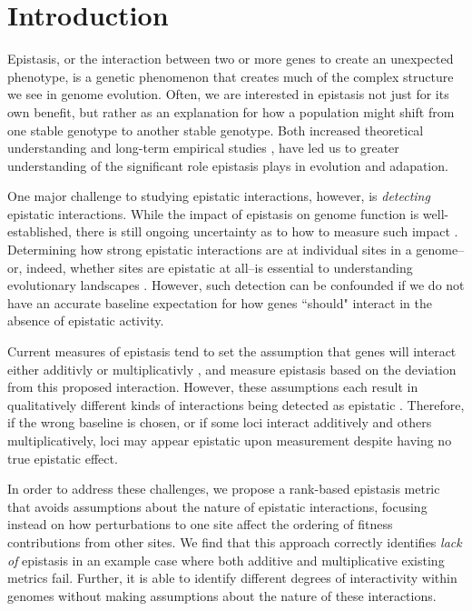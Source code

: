 \section{Introduction}

Epistasis, or the interaction between two or more genes to create an unexpected phenotype, is a genetic phenomenon that creates much of the complex structure we see in genome evolution. Often, we are interested in epistasis not just for its own benefit, but rather as an explanation for how a population might shift from one stable genotype to another stable genotype. Both increased theoretical understanding \citep{weinreich_should_2013, payne_causes_2019} and long-term empirical studies \citep{khan_negative_2011, wiser_long-term_2013, gupta_shared_2016}, have led us to greater understanding of the significant role epistasis plays in evolution and adapation.

One major challenge to studying epistatic interactions, however, is \textit{detecting} epistatic interactions. While the impact of epistasis on genome function is well-established, there is still ongoing uncertainty as to how to measure such impact \citep{cordell_epistasis_2002,de_visser_causes_2011, mackay_epistasis_2014, niel_survey_2015}. Determining how strong epistatic interactions are at individual sites in a genome--or, indeed, whether sites are epistatic at all--is essential to understanding evolutionary landscapes \citep{weinreich_should_2013}. However, such detection can be confounded if we do not have an accurate baseline expectation for how genes ``should" interact in the absence of epistatic activity. 

Current measures of epistasis tend to set the assumption that genes will interact either additivly \citep{ostman_impact_2011} or multiplicativly \citep{elena_test_1997}, and measure epistasis based on the deviation from this proposed interaction. However, these assumptions each result in qualitatively different kinds of interactions being detected as epistatic \citep{puniyani_meaning_2004}. Therefore, if the wrong baseline is chosen, or if some loci interact additively and others multiplicatively, loci may appear epistatic upon measurement despite having no true epistatic effect.

In order to address these challenges, we propose a rank-based epistasis metric that avoids assumptions about the nature of epistatic interactions, focusing instead on how perturbations to one site affect the ordering of fitness contributions from other sites. We find that this approach correctly identifies \textit{lack of} epistasis in an example case where both additive and multiplicative existing metrics fail. Further, it is able to identify different degrees of interactivity within genomes without making assumptions about the nature of these interactions.